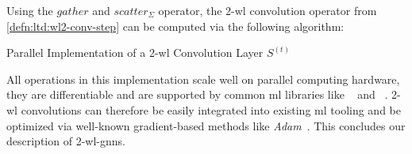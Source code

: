 Using the $\mathit{gather}$ and $\mathit{scatter}_{\Sigma}$ operator, the 2-\acs{wl} convolution operator from \cref{defn:ltd:wl2-conv-step} can be computed via the following algorithm:
\begin{algorithm}[H]
	\caption{Parallel Implementation of a 2-\acs{wl} Convolution Layer $S^{(t)}$}\label{algo:ltd:wl2-conv}
	\begin{algorithmic}[1]
		\EndFunction{}
	\end{algorithmic}
\end{algorithm}
All operations in this implementation scale well on parallel computing hardware, they are differentiable and are supported by common \ac{ml} libraries like ~\cite{Abadi2015}\cite{TF} and ~\cite{Paszke2019}\cite{PyT}.
2-\acs{wl} convolutions can therefore be easily integrated into existing \ac{ml} tooling and be optimized via well-known gradient-based methods like \textit{Adam}~\cite{Kingma2015}.
This concludes our description of 2-\acs{wl}-\acsp{gnn}.
